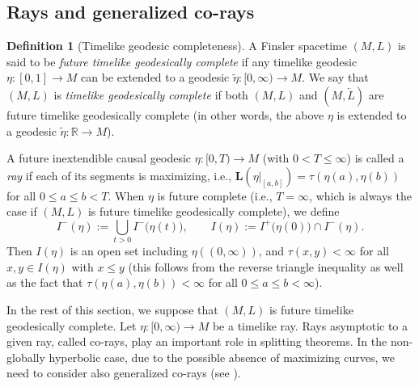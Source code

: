 \documentclass[a4paper,11pt]{article}
\numberwithin{equation}{section}
\theoremstyle{definition}
\newtheorem{definition}{Definition}[section]
\theoremstyle{plain}
\newcommand{\lra}{\longrightarrow}
\newcommand{\R}{\ensuremath{\mathbb{R}}}
\newcommand{\bL}{\ensuremath{\mathbf{L}}}
\newcommand{\rev}[1]{\overleftarrow{#1}}
\begin{document}
\subsection{Rays and generalized co-rays}\label{ssc:ray}

\begin{definition}[Timelike geodesic completeness]\label{df:gcmplt}
A Finsler spacetime $(M,L)$ is said to be \emph{future timelike geodesically complete}
if any timelike geodesic $\eta\colon [0,1] \lra M$ can be extended to a geodesic
$\tilde{\eta}\colon [0,\infty) \lra M$.
We say that $(M,L)$ is \emph{timelike geodesically complete}
if both $(M,L)$ and $(M,\rev{L})$ are future timelike geodesically complete
(in other words, the above $\eta$ is extended to a geodesic $\tilde{\eta}\colon \R \lra M$).
\end{definition}

A future inextendible causal geodesic $\eta\colon [0,T) \lra M$ (with $0 < T \leq \infty$) is called a \emph{ray}
if each of its segments is maximizing, i.e.,
$\bL(\eta|_{[a,b]})=\tau(\eta(a),\eta(b))$ for all $0\le a\le b < T$.
When $\eta$ is future complete (i.e., $T=\infty$, which is always the case if $(M,L)$ is future timelike geodesically complete), we define
\begin{equation}\label{eq:I(eta)}
I^-(\eta) := \bigcup_{t>0} I^-\big( \eta(t) \big), \qquad
I(\eta) :=I^+\big( \eta(0) \big) \cap I^-(\eta).
\end{equation}
Then $I(\eta)$ is an open set including $\eta((0,\infty))$, and $\tau(x,y)<\infty$ for all $x,y \in I(\eta)$ with $x \le y$ (this follows from the reverse triangle inequality as well as the fact that $\tau(\eta(a),\eta(b)) < \infty$ for all $0 \le a \le b <\infty$).

In the rest of this section, we suppose that $(M,L)$ is future timelike geodesically complete.
Let $\eta\colon [0,\infty) \lra M$ be a timelike ray.
Rays asymptotic to a given ray, called co-rays, play an important role in splitting theorems.
In the non-globally hyperbolic case, due to the possible absence of maximizing curves, we need to consider also generalized co-rays (see \cite{BeemEhrlichMarkvorsenGalloway84,BEMG85,EG}).
\end{document}
